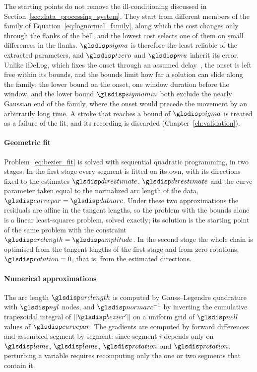 \documentclass[12pt]{report}
\begin{document}
The starting points do not remove the ill-conditioning discussed in Section~\ref{sec:data_processing_system}. They start from different members of the family of Equation~\eqref{eq:lognormal_family}, along which the cost changes only through the flanks of the bell, and the lowest cost selects one of them on small differences in the flanks. $\sym{sigma}_k$ is therefore the least reliable of the extracted parameters, and $\sym{tzero}_k$ and $\sym{mu}_k$ inherit its error. Unlike iDeLog, which fixes the onset through an assumed delay~\cite{idelog}, the onset is left free within its bounds, and the bounds limit how far a solution can slide along the family: the lower bound on the onset, one window duration before the window, and the lower bound $\sym{sigmamin}$ both exclude the nearly Gaussian end of the family, where the onset would precede the movement by an arbitrarily long time. A stroke that reaches a bound of $\sym{sigma}$ is treated as a failure of the fit, and its recording is discarded (Chapter~\ref{ch:validation}).

\paragraph{Geometric fit}
Problem~\eqref{eq:bezier_fit} is solved with sequential quadratic programming, in two stages. In the first stage every segment is fitted on its own, with its directions fixed to the estimates $\sym{direstimate}_i$, $\sym{direstimate}_{i+1}$ and the curve parameter taken equal to the normalized arc length of the data, $\sym{curvepar}=\sym{dataarc}_{i,n}$. Under these two approximations the residuals are affine in the tangent lengths, so the problem with the bounds alone is a linear least-squares problem, solved exactly; its solution is the starting point of the same problem with the constraint $\sym{arclength}_i=\sym{amplitude}_i$. In the second stage the whole chain is optimised from the tangent lengths of the first stage and from zero rotations, $\sym{rotation}_j=0$, that is, from the estimated directions.

\paragraph{Numerical approximations}
The arc length $\sym{arclength}_i$ is computed by Gauss--Legendre quadrature with $\sym{ngl}$ nodes, and $\sym{normarc}_i^{-1}$ by inverting the cumulative trapezoidal integral of $\lVert \sym{bezier}_i^{\prime}\rVert$ on a uniform grid of $\sym{nell}$ values of $\sym{curvepar}$. The gradients are computed by forward differences and assembled segment by segment: since segment $i$ depends only on $\sym{lams}_i$, $\sym{lame}_i$, $\sym{rotation}_i$ and $\sym{rotation}_{i+1}$, perturbing a variable requires recomputing only the one or two segments that contain it.
\end{document}
